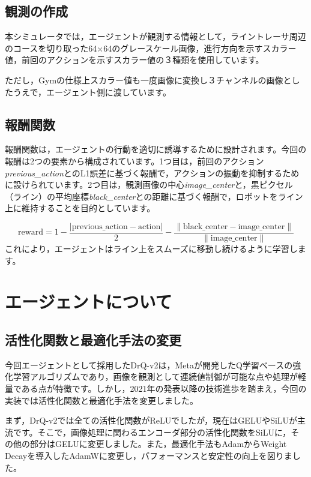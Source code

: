 \documentclass{jsbook}
\numberwithin{equation}{section}
\begin{document}
\subsection{観測の作成}
本シミュレータでは，エージェントが観測する情報として，ライントレーサ周辺のコースを切り取った64×64のグレースケール画像，進行方向を示すスカラー値，前回のアクションを示すスカラー値の３種類を使用しています。

ただし，Gymの仕様上スカラー値も一度画像に変換し３チャンネルの画像としたうえで，エージェント側に渡しています。

\subsection{報酬関数}
報酬関数は，エージェントの行動を適切に誘導するために設計されます。今回の報酬は2つの要素から構成されています。1つ目は，前回のアクション\textit{previous\_action}とのL1誤差に基づく報酬で，アクションの振動を抑制するために設けられています。2つ目は，観測画像の中心\textit{image\_center}と，黒ピクセル（ライン）の平均座標\textit{black\_center}との距離に基づく報酬で，ロボットをライン上に維持することを目的としています。

\[
\text{reward} = 1 - \frac{| \text{previous\_action} - \text{action} |}{2} - \frac{\| \text{black\_center} - \text{image\_center} \|}{\| \text{image\_center} \|}
\]
これにより，エージェントはライン上をスムーズに移動し続けるように学習します。

\section{エージェントについて}

\subsection{活性化関数と最適化手法の変更}
今回エージェントとして採用したDrQ-v2\cite{yarats2021masteringvisualcontinuouscontrol}は，Metaが開発したQ学習ベースの強化学習アルゴリズムであり，画像を観測として連続値制御が可能な点や処理が軽量である点が特徴です。しかし，2021年の発表以降の技術進歩を踏まえ，今回の実装では活性化関数と最適化手法を変更しました。

まず，DrQ-v2では全ての活性化関数がReLUでしたが，現在はGELUやSiLUが主流です。そこで，画像処理に関わるエンコーダ部分の活性化関数をSiLUに，その他の部分はGELUに変更しました。また，最適化手法もAdamからWeight Decayを導入したAdamWに変更し，パフォーマンスと安定性の向上を図りました。
\end{document}
